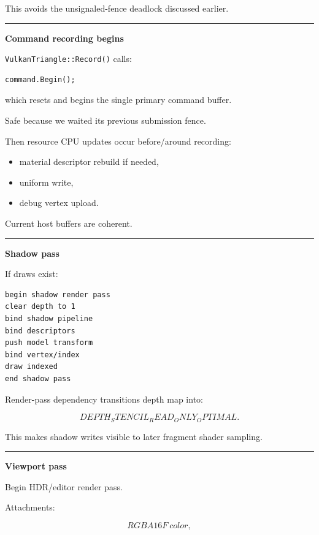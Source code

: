 This avoids the unsignaled-fence deadlock discussed earlier.

\begin{center}\rule{0.5\linewidth}{0.5pt}\end{center}

\textbf{Command recording begins}

\texttt{VulkanTriangle::Record()} calls:

\begin{verbatim}
command.Begin();
\end{verbatim}

which resets and begins the single primary command buffer.

Safe because we waited its previous submission fence.

Then resource CPU updates occur before/around recording:

\begin{itemize}
\tightlist
\item
  material descriptor rebuild if needed,
\item
  uniform write,
\item
  debug vertex upload.
\end{itemize}

Current host buffers are coherent.

\begin{center}\rule{0.5\linewidth}{0.5pt}\end{center}

\textbf{Shadow pass}

If draws exist:

\begin{verbatim}
begin shadow render pass
clear depth to 1
bind shadow pipeline
bind descriptors
push model transform
bind vertex/index
draw indexed
end shadow pass
\end{verbatim}

Render-pass dependency transitions depth map into:

\[
DEPTH_STENCIL_READ_ONLY_OPTIMAL.
\]

This makes shadow writes visible to later fragment shader sampling.

\begin{center}\rule{0.5\linewidth}{0.5pt}\end{center}

\textbf{Viewport pass}

Begin HDR/editor render pass.

Attachments:

\[
RGBA16F\ color,
\]

